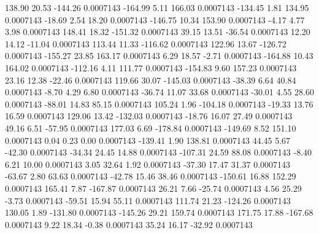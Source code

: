       138.90       20.53     -144.26     0.0007143
     -164.99        5.11      166.03     0.0007143
     -134.45        1.81      134.95     0.0007143
      -18.69        2.54       18.20     0.0007143
     -146.75       10.34      153.90     0.0007143
       -4.17        4.77        3.98     0.0007143
      148.41       18.32     -151.32     0.0007143
       39.15       13.51      -36.54     0.0007143
       12.20       14.12      -11.04     0.0007143
      113.44       11.33     -116.62     0.0007143
      122.96       13.67     -126.72     0.0007143
     -155.27       23.85      163.17     0.0007143
        6.29       18.57       -2.71     0.0007143
     -164.88       10.43      164.02     0.0007143
     -112.16        4.11      111.77     0.0007143
     -154.83        9.60      157.23     0.0007143
       23.16       12.38      -22.46     0.0007143
      119.66       30.07     -145.03     0.0007143
      -38.39        6.64       40.84     0.0007143
       -8.70        4.29        6.80     0.0007143
      -36.74       11.07       33.68     0.0007143
      -30.01        4.55       28.60     0.0007143
      -88.01       14.83       85.15     0.0007143
      105.24        1.96     -104.18     0.0007143
      -19.33       13.76       16.59     0.0007143
      129.06       13.42     -132.03     0.0007143
      -18.76       16.07       27.49     0.0007143
       49.16        6.51      -57.95     0.0007143
      177.03        6.69     -178.84     0.0007143
     -149.69        8.52      151.10     0.0007143
        0.04        0.23        0.00     0.0007143
     -139.41        1.90      138.81     0.0007143
       44.45        5.67      -42.30     0.0007143
      -34.34       24.45       14.88     0.0007143
     -107.31       24.59       88.08     0.0007143
       -8.40        6.21       10.00     0.0007143
        3.05       32.64        1.92     0.0007143
      -37.30       17.47       31.37     0.0007143
      -63.67        2.80       63.63     0.0007143
      -42.78       15.46       38.46     0.0007143
     -150.61       16.88      152.29     0.0007143
      165.41        7.87     -167.87     0.0007143
       26.21        7.66      -25.74     0.0007143
        4.56       25.29       -3.73     0.0007143
      -59.51       15.94       55.11     0.0007143
      111.74       21.23     -124.26     0.0007143
      130.05        1.89     -131.80     0.0007143
     -145.26       29.21      159.74     0.0007143
      171.75       17.88     -167.68     0.0007143
        9.22       18.34       -0.38     0.0007143
       35.24       16.17      -32.92     0.0007143
